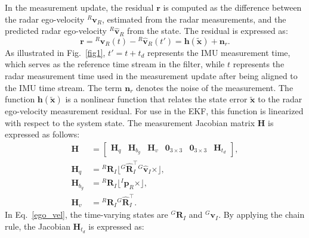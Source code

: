 In the measurement update, the residual \( \mathbf{r} \) is computed as the difference between the radar ego-velocity \( {}^R\mathbf{v}_R \), estimated from the radar measurements, and the predicted radar ego-velocity \( {}^R\hat{\mathbf{v}}_R \) from the state. The residual is expressed as:
\begin{equation}
\label{residual}
    \mathbf{r} = {}^R\mathbf{v}_R(t) - {}^R\hat{\mathbf{v}}_R(t') = \mathbf{h}(\tilde{\mathbf{x}}) + \mathbf{n}_r.
\end{equation}
As illustrated in Fig.~\ref{fig1}, \( t' = t + t_d \) represents the IMU measurement time, which serves as the reference time stream in the filter, while \( t \) represents the radar measurement time used in the measurement update after being aligned to the IMU time stream. The term \( \mathbf{n}_r \) denotes the noise of the measurement. The function \( \mathbf{h}(\tilde{\mathbf{x}}) \) is a nonlinear function that relates the state error \( \tilde{\mathbf{x}} \) to the radar ego-velocity measurement residual. For use in the EKF, this function is linearized with respect to the system state. The measurement Jacobian matrix \( \mathbf{H} \) is expressed as follows:
\begin{equation}
\begin{aligned}
    \mathbf{H} &= 
    \begin{bmatrix}
        \mathbf{H}_q & \mathbf{H}_{b_g} & \mathbf{H}_v & \mathbf{0}_{3 \times 3} & \mathbf{0}_{3 \times 3} & \mathbf{H}_{t_d}
    \end{bmatrix}, \\
    \mathbf{H}_q &= {}^R\mathbf{R}_I \lfloor {}^G\hat{\mathbf{R}}_I^\top {}^G\hat{\mathbf{v}}_I \times \rfloor,\\
    \mathbf{H}_{b_g} &= {}^R\mathbf{R}_I \lfloor {}^I\mathbf{p}_R \times \rfloor,\\
    \mathbf{H}_v &= {}^R\mathbf{R}_I {}^G\hat{\mathbf{R}}_I^\top.
\end{aligned}
\end{equation}
In Eq.~\eqref{ego_vel}, the time-varying states are \( {}^G\mathbf{R}_I \) and \( {}^G\mathbf{v}_I \). By applying the chain rule, the Jacobian \( \mathbf{H}_{t_d} \) is expressed as:
